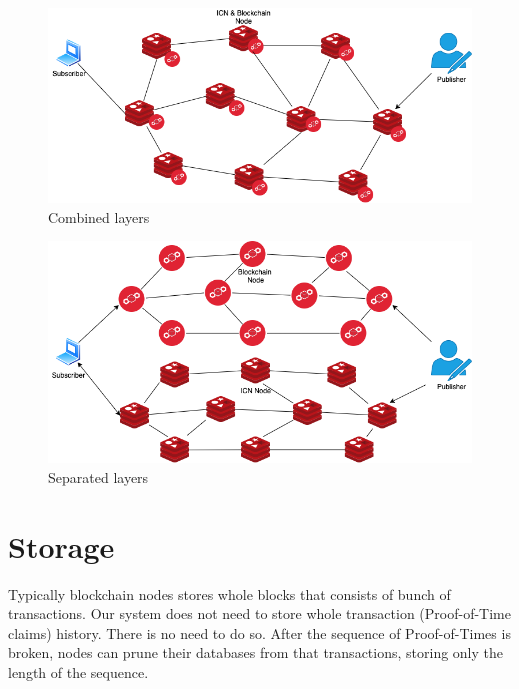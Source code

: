 \begin{figure}[h!]
\centering
\includegraphics[width=1\textwidth]{img/combined-layers.png}
\caption{Combined layers}
\label{fig:combined_layers}
\end{figure}

\begin{figure}[h!]
\centering
\includegraphics[width=1\textwidth]{img/separated-layers.png}
\caption{Separated layers}
\label{fig:separated_layers}
\end{figure}


\section{Storage}
Typically blockchain nodes stores whole blocks that consists of bunch of transactions. Our system does not need to store whole transaction (Proof-of-Time claims) history. There is no need to do so. After the sequence of Proof-of-Times is broken, nodes can prune their databases from that transactions, storing only the length of the sequence.
